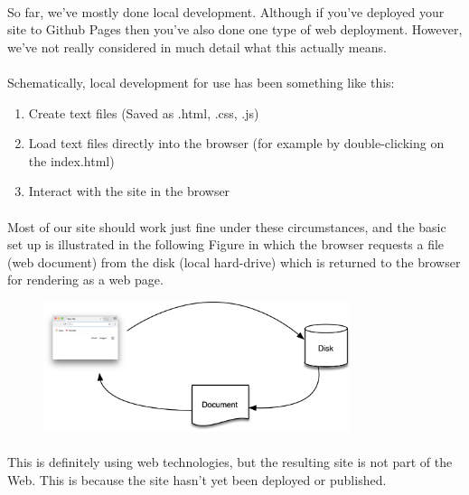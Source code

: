 \paragraph{} So far, we've mostly done local development. Although if you've deployed your site to Github Pages then you've also done one type of web deployment. However, we've not really considered in much detail what this actually means.
\paragraph{} Schematically, local development for use has been something like this:

\begin{enumerate}
\item Create text files (Saved as .html, .css, .js)
\item Load text files directly into the browser (for example by double-clicking on the index.html)
\item Interact with the site in the browser
\end{enumerate}

\paragraph{} Most of our site should work just fine under these circumstances, and the basic set up is illustrated in the following Figure in which the browser requests a file (web document) from the disk (local hard-drive) which is returned to the browser for rendering as a web page.


\begin{figure}[H]
\centering
\includegraphics[width=0.8\textwidth]{figures/local-web-dev}
\label{fig:local-web-dev}
\caption{}
\end{figure}

\paragraph{} This is definitely using web technologies, but the resulting site is not part of the Web. This is because the site hasn't yet been deployed or published.


